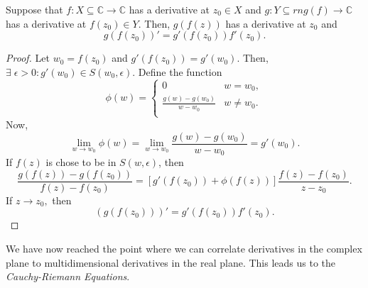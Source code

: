 \documentclass[12pt]{book}
\begin{document}
\begin{thm}
    Suppose that $f: X \subseteq \mathbb{C} \rightarrow \mathbb{C}$ has a derivative at $z_0 \in X$ and $g: Y \subseteq rng(f) \rightarrow \mathbb{C}$ has a derivative at $f(z_0) \in Y$. Then, $g(f(z))$ has a derivative at $z_0$ and 
    $$
        g(f(z_0))' = g'(f(z_0)) f'(z_0).
    $$
\end{thm}
\begin{proof}
    Let $w_0 = f(z_0)$ and $g'(f(z_0)) = g'(w_0).$ Then, $\exists\; \epsilon > 0: g'(w_0) \in S(w_0, \epsilon).$ Define the function
    $$
        \phi(w) = 
            \left\{
                \begin{array}{cc}
                    0 & w = w_0, \\
                    \frac{g(w) - g(w_0)}{w - w_0} & w \neq w_0. \\
                \end{array}
            \right.
    $$
    Now, 
    $$
        \lim_{w \rightarrow w_0} \phi(w) = \lim_{w \rightarrow w_0} \frac{g(w) - g(w_0)}{w - w_0} = g'(w_0).
    $$
    If $f(z)$ is chose to be in $S(w, \epsilon)$, then
    $$
        \frac{g(f(z)) - g(f(z_0))}{f(z) - f(z_0)} = [g'(f(z_0)) + \phi(f(z))]\frac{f(z) - f(z_0)}{z - z_0}.
    $$
    If $z \rightarrow z_0,$ then
    $$
        (g(f(z_0)))' = g'(f(z_0))f'(z_0).
    $$
\end{proof}
We have now reached the point where we can correlate derivatives in the complex plane to multidimensional derivatives in the real plane. This leads us to the \textit{Cauchy-Riemann Equations}.
\end{document}
